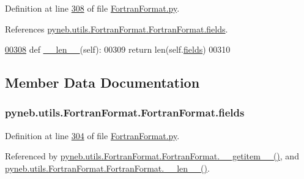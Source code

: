 Definition at line \hyperlink{_fortran_format_8py_source_l00308}{308} of file \hyperlink{_fortran_format_8py_source}{Fortran\+Format.\+py}.



References \hyperlink{_fortran_format_8py_source_l00304}{pyneb.\+utils.\+Fortran\+Format.\+Fortran\+Format.\+fields}.


\begin{DoxyCode}
\hypertarget{classpyneb_1_1utils_1_1_fortran_format_1_1_fortran_format_l00308}{}\hyperlink{classpyneb_1_1utils_1_1_fortran_format_1_1_fortran_format_abd54b6a502a35a8e4dabcbcb0632cff7}{00308}     \textcolor{keyword}{def }\hyperlink{classpyneb_1_1utils_1_1_fortran_format_1_1_fortran_format_abd54b6a502a35a8e4dabcbcb0632cff7}{\_\_len\_\_}(self):
00309         \textcolor{keywordflow}{return} len(self.\hyperlink{classpyneb_1_1utils_1_1_fortran_format_1_1_fortran_format_ac8f962282ba9e35ccd8dad5feacd3813}{fields})
00310 
\end{DoxyCode}


\subsection{Member Data Documentation}
\hypertarget{classpyneb_1_1utils_1_1_fortran_format_1_1_fortran_format_ac8f962282ba9e35ccd8dad5feacd3813}{}
\subsubsection[{fields}]{\setlength{\rightskip}{0pt plus 5cm}pyneb.\+utils.\+Fortran\+Format.\+Fortran\+Format.\+fields}\label{classpyneb_1_1utils_1_1_fortran_format_1_1_fortran_format_ac8f962282ba9e35ccd8dad5feacd3813}


Definition at line \hyperlink{_fortran_format_8py_source_l00304}{304} of file \hyperlink{_fortran_format_8py_source}{Fortran\+Format.\+py}.



Referenced by \hyperlink{_fortran_format_8py_source_l00311}{pyneb.\+utils.\+Fortran\+Format.\+Fortran\+Format.\+\_\+\+\_\+getitem\+\_\+\+\_\+()}, and \hyperlink{_fortran_format_8py_source_l00308}{pyneb.\+utils.\+Fortran\+Format.\+Fortran\+Format.\+\_\+\+\_\+len\+\_\+\+\_\+()}.

